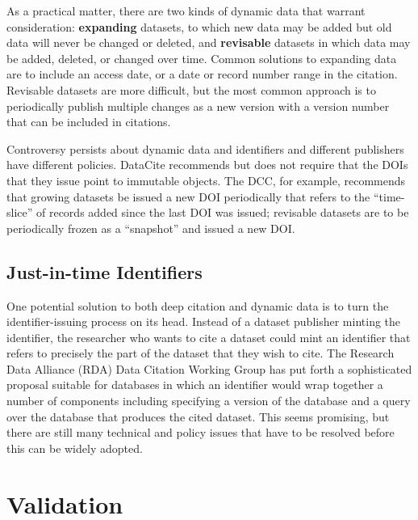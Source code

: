 \documentclass[10pt,a4paper,twocolumn]{article}
\begin{document}
As a practical matter, there are two kinds of dynamic data that warrant consideration: \textbf{expanding} datasets, to which new data may be added but old data will never be changed or deleted, and \textbf{revisable} datasets in which data may be added, deleted, or changed over time. 
Common solutions to expanding data are to include an access date, or a date or record number range in the citation. 
Revisable datasets are more difficult, but the most common approach is to periodically publish multiple changes as a new version with a version number that can be included in citations.

Controversy persists about dynamic data and identifiers and different publishers have different policies. 
DataCite recommends but does not require that the DOIs that they issue point to immutable objects. 
The DCC, for example, recommends that growing datasets be issued a new DOI periodically that refers to the ``time-slice'' of records added since the last DOI was issued; revisable datasets are to be periodically frozen as a ``snapshot'' and issued a new DOI.

\subsection*{Just-in-time Identifiers}\label{just-in-time-identifiers}

One potential solution to both deep citation and dynamic data is to turn the identifier-issuing process on its head. 
Instead of a dataset publisher minting the identifier, the researcher who wants to cite a dataset could mint an identifier that refers to precisely the part of the dataset that they wish to cite. 
The Research Data Alliance (RDA) Data Citation Working Group has put forth a sophisticated proposal suitable for databases in which an identifier would wrap together a number of components including specifying a version of the database and a query over the database that produces the cited dataset. 
This seems promising, but there are still many technical and policy issues that have to be resolved before this can be widely adopted.

\section*{Validation}\label{trustworthiness}

\end{document}
